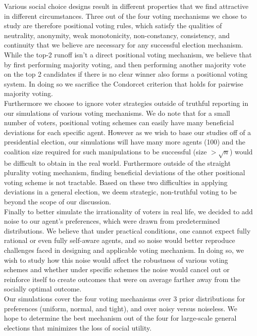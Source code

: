 \documentclass[11pt]{scrartcl}
\begin{document}
Various social choice designs result in different properties that we find attractive in different circumstances. Three out of the four voting mechanisms we chose to study are therefore positional voting rules, which satisfy the qualities of neutrality, anonymity, weak monotonicity, non-constancy, consistency, and continuity that we believe are necessary for any successful election mechanism. While the top-2 runoff isn't a direct positional voting mechanism, we believe that by first performing majority voting, and then performing another majority vote on the top 2 candidates if there is no clear winner also forms a positional voting system. In doing so we sacrifice the Condorcet criterion that holds for pairwise majority voting.\\

Furthermore we choose to ignore voter strategies outside of truthful reporting in our simulations of various voting mechanisms. We do note that for a small number of voters, positional voting schemes can easily have many beneficial deviations for each specific agent. However as we wish to base our studies off of a presidential election, our simulations will have many more agents (100) and the coalition size required for such manipulations to be successful (size $>\sqrt{n}$) would be difficult to obtain in the real world. Furthermore outside of the straight plurality voting mechanism, finding beneficial deviations of the other positional voting scheme is not tractable. Based on these two difficulties in applying deviations in a general election, we deem strategic, non-truthful voting to be beyond the scope of our discussion.\\

Finally to better simulate the irrationality of voters in real life, we decided to add noise to our agent's preferences, which were drawn from predetermined distributions. We believe that under practical conditions, one cannot expect fully rational or even fully self-aware agents, and so noise would better reproduce challenges faced in designing and applicable voting mechanism. In doing so, we wish to study how this noise would affect the robustness of various voting schemes and whether under specific schemes the noise would cancel out or reinforce itself to create outcomes that were on average farther away from the socially optimal outcome.\\

Our simulations cover the four voting mechanisms over 3 prior distributions for preferences (uniform, normal, and tight), and over noisy versus noiseless. We hope to determine the best mechanism out of the four for large-scale general elections that minimizes the loss of social utility.
\end{document}
